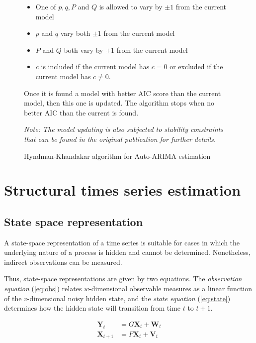 \begin{figure}[H]
{{{			\begin{itemize}
				\item One of $p, q, P$ and $Q$ is allowed to vary by $\pm1$ from the current model
				\item $p$ and $q$ vary both $\pm1$ from the current model
				\item $P$ and $Q$ both vary by $\pm1$ from the current model
				\item $c$ is included if the current model has $c=0$ or excluded if the current model has $c\neq0$.
			\end{itemize}
		
			Once it is found a model with better AIC score than the current model, then this one is updated. The algorithm stops when no better AIC than the current is found. 
			
			
			\emph{Note: The model updating is also subjected to stability constraints that can be found in the original publication for further details.}
			
		}
	}}
	\caption{Hyndman-Khandakar algorithm for Auto-ARIMA estimation}
	\label{alg:autoarima}
\end{figure}



\section{Structural times series estimation}

\subsection{State space representation}

A state-space representation of a time series is suitable for cases in which the underlying nature of a process is hidden and cannot be determined. Nonetheless,  indirect observations can be measured.

Thus, state-space representations are given by two equations. The \emph{observation equation} (\ref{eq:obs}) relates $w$-dimensional observable measures as a linear function of the $v$-dimensional noisy hidden state, and the \emph{state equation} (\ref{eq:state}) determines how the hidden state will transition from time $t$ to $t+1$.

\begin{align}
	\bm{Y}_t		&=	G\bm{X}_t + \bm{W}_t  \label{eq:obs} \\
	\bm{X}_{t+1}	&=	F\bm{X}_t + \bm{V}_t \label{eq:state} 
\end{align}

